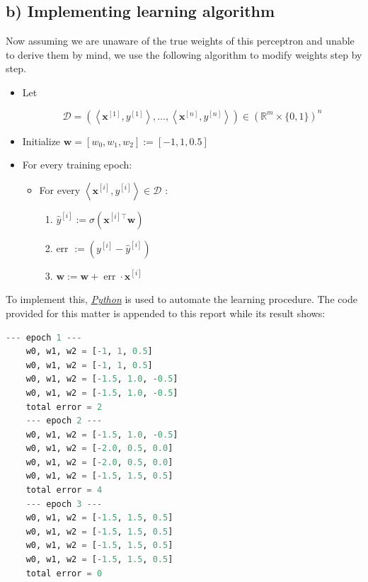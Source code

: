 \documentclass[conference]{IEEEtran}
\begin{document}
\subsection*{b) Implementing learning algorithm}
Now assuming we are unaware of the true weights of this perceptron and unable to derive them by mind, we use the following algorithm to modify weights step by step.
\begin{itemize}
    \item Let \begin{footnotesize}
              $$
                  \mathcal{D}=\left(\left\langle\mathbf{x}^{[1]}, y^{[1]}\right\rangle, \ldots,\left\langle\mathbf{x}^{[n]}, y^{[n]}\right\rangle\right) \in\left(\mathbb{R}^m \times\{0,1\}\right)^n
              $$
          \end{footnotesize}
    \item Initialize $\mathbf{w}=[w_0, w_1, w_2]:=[-1, 1, 0.5]$
    \item For every training epoch: \begin{itemize}
              \item For every $\left\langle\mathbf{x}^{[i]}, y^{[i]}\right\rangle \in \mathcal{D}$ : \begin{enumerate}
                        \item $\hat{y}^{[i]}:=\sigma\left(\mathbf{x}^{[i] \top} \mathbf{w}\right)$
                        \item err $:=\left(y^{[i]}-\hat{y}^{[i]}\right)$
                        \item $\mathbf{w}:=\mathbf{w}+\operatorname{err} \cdot \mathbf{x}^{[i]}$
                    \end{enumerate}
          \end{itemize}
\end{itemize}

To implement this, \textit{\underline{Python}} is used to automate the learning procedure. The code provided for this matter is appended to this report while its result shows:

\begin{mylistingbox}
    \begin{lstlisting}[language=Python]
    --- epoch 1 ---
    w0, w1, w2 = [-1, 1, 0.5]
    w0, w1, w2 = [-1, 1, 0.5]
    w0, w1, w2 = [-1.5, 1.0, -0.5]
    w0, w1, w2 = [-1.5, 1.0, -0.5]
    total error = 2
    --- epoch 2 ---
    w0, w1, w2 = [-1.5, 1.0, -0.5]
    w0, w1, w2 = [-2.0, 0.5, 0.0]
    w0, w1, w2 = [-2.0, 0.5, 0.0]
    w0, w1, w2 = [-1.5, 1.5, 0.5]
    total error = 4
    --- epoch 3 ---
    w0, w1, w2 = [-1.5, 1.5, 0.5]
    w0, w1, w2 = [-1.5, 1.5, 0.5]
    w0, w1, w2 = [-1.5, 1.5, 0.5]
    w0, w1, w2 = [-1.5, 1.5, 0.5]
    total error = 0
\end{lstlisting}
\end{mylistingbox}
\end{document}
